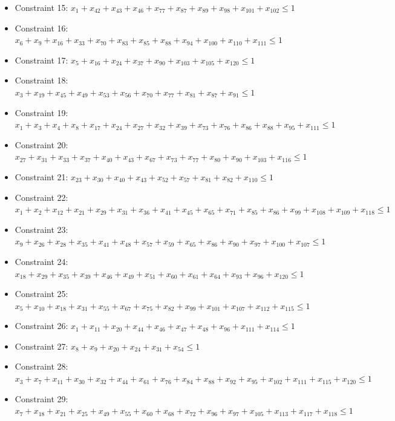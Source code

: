\documentclass[11pt]{article}
\begin{document}
\begin{itemize}
\item Constraint 15: $x_{1} + x_{42} + x_{43} + x_{46} + x_{77} + x_{87} + x_{89} + x_{98} + x_{101} + x_{102} \le 1$
\item Constraint 16: $x_{6} + x_{9} + x_{16} + x_{33} + x_{70} + x_{83} + x_{85} + x_{88} + x_{94} + x_{100} + x_{110} + x_{111} \le 1$
\item Constraint 17: $x_{5} + x_{16} + x_{24} + x_{37} + x_{90} + x_{103} + x_{105} + x_{120} \le 1$
\item Constraint 18: $x_{3} + x_{19} + x_{45} + x_{49} + x_{53} + x_{56} + x_{70} + x_{77} + x_{81} + x_{87} + x_{91} \le 1$
\item Constraint 19: $x_{1} + x_{3} + x_{4} + x_{8} + x_{17} + x_{24} + x_{27} + x_{32} + x_{39} + x_{73} + x_{76} + x_{86} + x_{88} + x_{95} + x_{111} \le 1$
\item Constraint 20: $x_{27} + x_{31} + x_{33} + x_{37} + x_{40} + x_{43} + x_{67} + x_{73} + x_{77} + x_{80} + x_{90} + x_{103} + x_{116} \le 1$
\item Constraint 21: $x_{23} + x_{30} + x_{40} + x_{43} + x_{52} + x_{57} + x_{81} + x_{82} + x_{110} \le 1$
\item Constraint 22: $x_{1} + x_{2} + x_{12} + x_{21} + x_{29} + x_{31} + x_{36} + x_{41} + x_{45} + x_{65} + x_{71} + x_{85} + x_{86} + x_{99} + x_{108} + x_{109} + x_{118} \le 1$
\item Constraint 23: $x_{9} + x_{26} + x_{28} + x_{35} + x_{41} + x_{48} + x_{57} + x_{59} + x_{65} + x_{86} + x_{90} + x_{97} + x_{100} + x_{107} \le 1$
\item Constraint 24: $x_{18} + x_{29} + x_{35} + x_{39} + x_{46} + x_{49} + x_{51} + x_{60} + x_{61} + x_{64} + x_{93} + x_{96} + x_{120} \le 1$
\item Constraint 25: $x_{5} + x_{10} + x_{18} + x_{31} + x_{55} + x_{67} + x_{75} + x_{82} + x_{99} + x_{101} + x_{107} + x_{112} + x_{115} \le 1$
\item Constraint 26: $x_{1} + x_{11} + x_{20} + x_{44} + x_{46} + x_{47} + x_{48} + x_{96} + x_{111} + x_{114} \le 1$
\item Constraint 27: $x_{8} + x_{9} + x_{20} + x_{24} + x_{31} + x_{54} \le 1$
\item Constraint 28: $x_{3} + x_{7} + x_{11} + x_{30} + x_{32} + x_{44} + x_{61} + x_{76} + x_{84} + x_{88} + x_{92} + x_{95} + x_{102} + x_{111} + x_{115} + x_{120} \le 1$
\item Constraint 29: $x_{7} + x_{18} + x_{21} + x_{25} + x_{49} + x_{55} + x_{60} + x_{68} + x_{72} + x_{96} + x_{97} + x_{105} + x_{113} + x_{117} + x_{118} \le 1$

\end{itemize}
\end{document}
